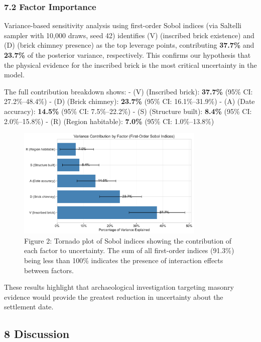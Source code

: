 \documentclass[
  11pt,
]{article}
\begin{document}
\subsubsection{7.2 Factor Importance}\label{factor-importance}

Variance-based sensitivity analysis using first-order Sobol indices (via
Saltelli sampler with 10,000 draws, seed 42) identifies (V) (inscribed
brick existence) and (D) (brick chimney presence) as the top leverage
points, contributing \textbf{37.7\%} and \textbf{23.7\%} of the
posterior variance, respectively. This confirms our hypothesis that the
physical evidence for the inscribed brick is the most critical
uncertainty in the model.

The full contribution breakdown shows: - (V) (Inscribed brick):
\textbf{37.7\%} (95\% CI: 27.2\%--48.4\%) - (D) (Brick chimney):
\textbf{23.7\%} (95\% CI: 16.1\%--31.9\%) - (A) (Date accuracy):
\textbf{14.5\%} (95\% CI: 7.5\%--22.2\%) - (S) (Structure built):
\textbf{8.4\%} (95\% CI: 2.0\%--15.8\%) - (R) (Region habitable):
\textbf{7.0\%} (95\% CI: 1.0\%--13.8\%)

\begin{figure}
\centering
\includegraphics[width=0.8\textwidth]{figures/sobol_indices.pdf}
\caption{Figure 2: Tornado plot of Sobol indices showing the
contribution of each factor to uncertainty. The sum of all first-order
indices (91.3\%) being less than 100\% indicates the presence of
interaction effects between factors.}
\end{figure}

These results highlight that archaeological investigation targeting
masonry evidence would provide the greatest reduction in uncertainty
about the settlement date.

\subsection{8 Discussion}\label{discussion}
\end{document}
